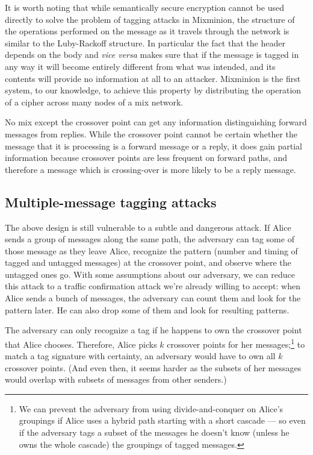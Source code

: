 \documentclass[final,inpress,inline]{ieee}
\begin{document}
It is worth noting that while semantically secure encryption cannot be
used directly to solve the problem of tagging attacks in Mixminion, the
structure of the operations performed on the message as it travels
through the network is similar to the Luby-Rackoff \cite{sprp}
structure. In particular the fact that the header depends on the body
and \emph{vice versa} makes sure that if the message is tagged in
any way it will become entirely different from what was intended, and
its contents
will provide no information at all to an attacker. Mixminion is the
first system, to our knowledge, to achieve this property by
distributing the operation of a cipher across many nodes of a mix network.

No mix except the crossover point can get any information distinguishing
forward messages from replies. While the crossover point cannot be
certain whether the message that it is processing is a forward message
or a reply, it does gain partial information because crossover points
are less frequent on forward paths, and therefore a message which is
crossing-over is more likely to be a reply message.

\subsection{Multiple-message tagging attacks}
\label{subsec:multi-tagging}

The above design is still vulnerable to a subtle and dangerous
attack. If Alice sends a group of messages along the same path, the
adversary can tag some of those message as they leave Alice, recognize
the pattern (number and timing of tagged and untagged messages) at the
crossover point, and observe where the untagged ones go.
With some assumptions about our adversary, we can reduce
this attack to a traffic confirmation attack we're already willing to
accept: when Alice sends a bunch of messages, the adversary can count
them and look for the pattern later. He can also drop some of them and
look for resulting patterns.

The adversary can only recognize a tag if he happens to own the crossover
point that Alice chooses.
Therefore, Alice picks $k$ crossover points for her
messages;\footnote{
  We can prevent the adversary from using divide-and-conquer on Alice's
  groupings if Alice uses a hybrid path starting with a short cascade ---
  so even if the adversary tags a subset of the messages he doesn't know
  (unless he owns the whole cascade) the groupings of tagged messages.
}
to match a tag signature with certainty, an adversary would
have to own all $k$ crossover points.  (And even then, it seems harder
as the subsets of her messages would overlap with subsets of
messages from other senders.)
\end{document}
